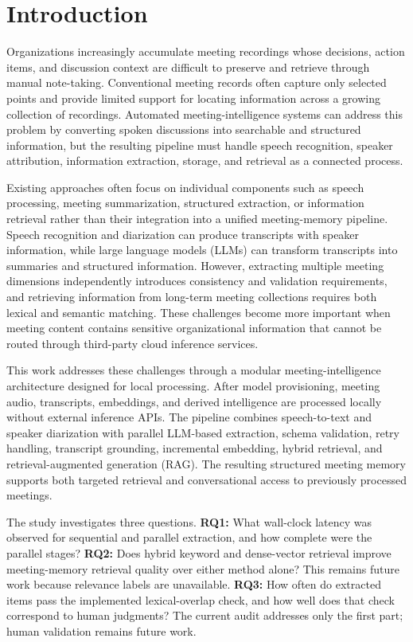 \documentclass[conference]{IEEEtran}
\begin{document}
\section{Introduction}

Organizations increasingly accumulate meeting recordings whose decisions, action items, and discussion context are difficult to preserve and retrieve through manual note-taking. Conventional meeting records often capture only selected points and provide limited support for locating information across a growing collection of recordings. Automated meeting-intelligence systems can address this problem by converting spoken discussions into searchable and structured information, but the resulting pipeline must handle speech recognition, speaker attribution, information extraction, storage, and retrieval as a connected process.

Existing approaches often focus on individual components such as speech processing, meeting summarization, structured extraction, or information retrieval rather than their integration into a unified meeting-memory pipeline. Speech recognition and diarization can produce transcripts with speaker information, while large language models (LLMs) can transform transcripts into summaries and structured information. However, extracting multiple meeting dimensions independently introduces consistency and validation requirements, and retrieving information from long-term meeting collections requires both lexical and semantic matching. These challenges become more important when meeting content contains sensitive organizational information that cannot be routed through third-party cloud inference services.

This work addresses these challenges through a modular meeting-intelligence architecture designed for local processing. After model provisioning, meeting audio, transcripts, embeddings, and derived intelligence are processed locally without external inference APIs. The pipeline combines speech-to-text and speaker diarization with parallel LLM-based extraction, schema validation, retry handling, transcript grounding, incremental embedding, hybrid retrieval, and retrieval-augmented generation (RAG). The resulting structured meeting memory supports both targeted retrieval and conversational access to previously processed meetings.

The study investigates three questions. \textbf{RQ1:} What wall-clock latency was observed for sequential and parallel extraction, and how complete were the parallel stages? \textbf{RQ2:} Does hybrid keyword and dense-vector retrieval improve meeting-memory retrieval quality over either method alone? This remains future work because relevance labels are unavailable. \textbf{RQ3:} How often do extracted items pass the implemented lexical-overlap check, and how well does that check correspond to human judgments? The current audit addresses only the first part; human validation remains future work.
\end{document}
